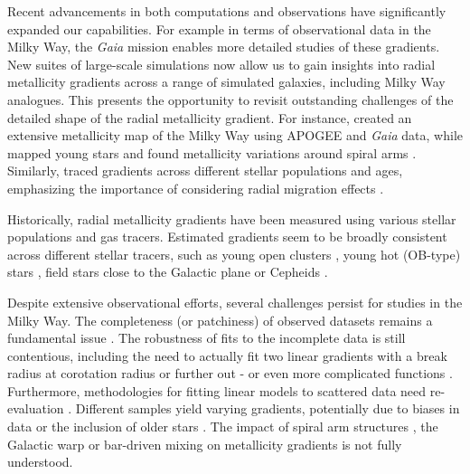 \documentclass[twocolumn,apj,numberedappendix,appendixfloats,twocolappendix]{openjournal}
\begin{document}
\begin{CJK*}{UTF8}{gbsn}
Recent advancements in both computations and observations have significantly expanded our capabilities. For example in terms of observational data in the Milky Way, the \textit{Gaia} mission \citep{Gaia-Collaboration2016} enables more detailed studies of these gradients. New suites of large-scale simulations now allow us to gain insights into radial metallicity gradients across a range of simulated galaxies, including Milky Way analogues. This presents the opportunity to revisit outstanding challenges of the detailed shape of the radial metallicity gradient. For instance, \citet{Hogg2019} created an extensive metallicity map of the Milky Way using APOGEE and \textit{Gaia} data, while \citet{Poggio2022} mapped young stars and found metallicity variations around spiral arms \citep[see also][]{Zari2018, Zari2021, Poggio2021, Hackshaw2024}. Similarly, \citet[][among others]{Imig2023} traced gradients across different stellar populations and ages, emphasizing the importance of considering radial migration effects \citep{Binney2008, Frankel2018, Frankel2020}.

Historically, radial metallicity gradients have been measured using various stellar populations and gas tracers. Estimated gradients seem to be broadly consistent across different stellar tracers, such as young open clusters \citep[e.g.][]{Yong2012, Cunha2016, Magrini2017, Casamiquela2019, Donor2020, Spina2021,Myers2022}, young hot (OB-type) stars \citep{Zari2018, Zari2021, Poggio2021, Poggio2022}, field stars close to the Galactic plane \citep[e.g.][]{Bergemann2014} or Cepheids \citep{Andrievsky2002, Andrievsky2002b, Lemasle2007, Lemasle2013}.

Despite extensive observational efforts, several challenges persist for studies in the Milky Way. The completeness (or patchiness) of observed datasets remains a fundamental issue \citep{Bergemann2014}. The robustness of fits to the incomplete data is still contentious, including the need to actually fit two linear gradients with a break radius at corotation radius \citep[][and references therein]{Bresolin2012} or further out \citep{Yong2012, Donor2020} - or even more complicated functions \citep[see e.g.][]{Chiappini2001, Kubryk2015}. Furthermore, methodologies for fitting linear models to scattered data need re-evaluation \citep{Metha2021}. Different samples yield varying gradients, potentially due to biases in data or the inclusion of older stars \citep[e.g.][]{AllendePrieto2006, Hayden2014, Anders2014, Vickers2021, Willett2023}. The impact of spiral arm structures \citep{Poggio2021}, the Galactic warp \citep{Lemasle2022} or bar-driven mixing \citep{DiMatteo2013} on metallicity gradients is not fully understood.


\end{CJK*}
\end{document}
